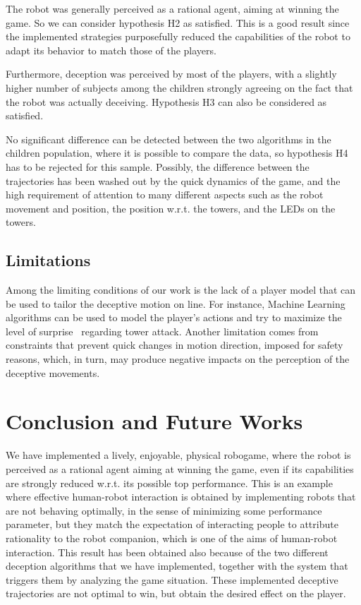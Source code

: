 
The robot was generally perceived as a rational agent, aiming at winning the game. So we can consider hypothesis H2 as satisfied. This is a good result since the implemented strategies purposefully reduced the capabilities of the robot to adapt its behavior to match those of the players.

Furthermore, deception was perceived by most of the players, with a slightly higher number of subjects among the children strongly agreeing on the fact that the robot was actually deceiving. Hypothesis H3 can also be considered as satisfied.

No significant difference can be detected between the two algorithms in the children population, where it is possible to compare the data, so hypothesis H4 has to be rejected for this sample. Possibly, the difference between the trajectories has been washed out by the quick dynamics of the game, and the high requirement of attention to many different aspects such as the robot movement and position, the position w.r.t. the towers, and the LEDs on the towers.

\subsection{Limitations}
Among the limiting conditions of our work is the lack of a player model that can be used to tailor the deceptive motion on line. For instance, Machine Learning algorithms can be used to model the player's actions and try to maximize the level of surprise~\cite{baldi_bits_2010} regarding tower attack.
Another limitation comes from constraints that prevent quick changes in motion direction, imposed for safety reasons, which, in turn, may produce negative impacts on the perception of the deceptive movements.

\section{Conclusion and Future Works}
\label{S:Conclusion}
We have implemented a lively, enjoyable, physical robogame, where the robot is perceived as a rational agent aiming at winning the game, even if its capabilities are strongly reduced w.r.t. its possible top performance. This is an example where effective human-robot interaction is obtained by implementing robots that are not behaving optimally, in the sense of minimizing some performance parameter, but they match the expectation of interacting people to attribute rationality to the robot companion, which is one of the aims of human-robot interaction.
This result has been obtained also because of the two different deception algorithms that we have implemented, together with the system that triggers them by analyzing the game situation. These implemented deceptive trajectories are not optimal to win, but obtain the desired effect on the player. 

